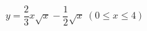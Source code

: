 \hspace*{2mm}\begin{minipage}[t]{\dimexpr\linewidth-2mm\relax}\vspace{0pt}
$y=\dfrac{2}{3}x\sqrt{x}-\dfrac{1}{2}\sqrt{x}\ (0\le x\le 4)$\end{minipage}
